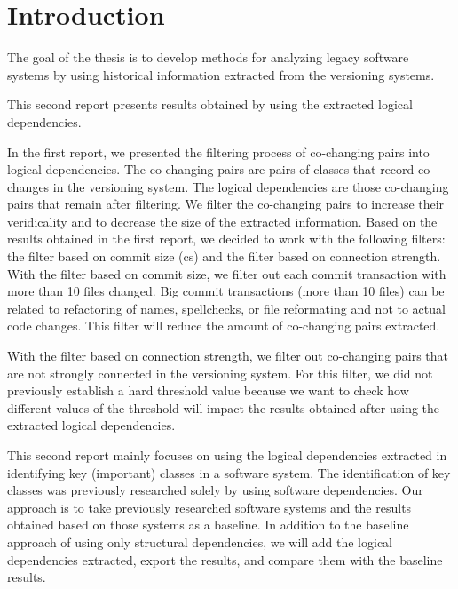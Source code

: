 \documentclass[12pt]{mitthesis}
\begin{document}


\tableofcontents

\pagestyle{plain}

\chapter{Introduction}

\hspace{5mm} The goal of the thesis is to develop methods for analyzing legacy software systems by using historical information extracted from the versioning systems.

This second report presents results obtained by using the extracted logical dependencies.

In the first report, we presented the filtering process of co-changing pairs into logical dependencies. 
The co-changing pairs are pairs of classes that record co-changes in the versioning system. The logical dependencies are those co-changing pairs that remain after filtering. We filter the co-changing pairs to increase their veridicality and to decrease the size of the extracted information. 
Based on the results obtained in the first report, we decided to work with the following filters: the filter based on commit size (cs) and the filter based on connection strength. 
With the filter based on commit size, we filter out each commit transaction with more than 10 files changed. Big commit transactions (more than 10 files) can be related to refactoring of names, spellchecks, or file reformating and not to actual code changes.
This filter will reduce the amount of co-changing pairs extracted. 

With the filter based on connection strength, we filter out co-changing pairs that are not strongly connected in the versioning system. For this filter, we did not previously establish a hard threshold value because we want to check how different values of the threshold will impact the results obtained after using the extracted logical dependencies.


This second report mainly focuses on using the logical dependencies extracted in identifying key (important) classes in a software system.
The identification of key classes was previously researched solely by using software dependencies. Our approach is to take previously researched software systems and the results obtained based on those systems as a baseline. In addition to the baseline approach of using only structural dependencies, we will add the logical dependencies extracted, export the results, and compare them with the baseline results. 
\end{document}
